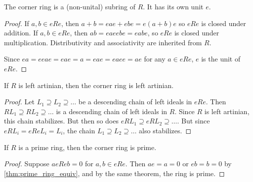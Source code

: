 \begin{theorem}
  \label{thm:corner_ring_is_ring}
  \leanok
  The corner ring is a (non-unital) subring of $R$. It has its own unit $e$.
\end{theorem}
\begin{proof}
  \leanok
  If $a, b \in eRe$, then $a + b = e a e + e b e = e (a + b) e$ so $eRe$ is closed under addition.
  If $a, b \in eRe$, then $a b = e a e e b e  = e a b e$, so $eRe$ is closed under multiplication.
  Distributivity and associativity are inherited from $R$.

  Since $e a = eeae = eae = a = eae = eaee = ae$ for any $a \in eRe$, $e$ is the unit of $eRe$.
\end{proof}

\begin{theorem}
  \label{thm:corner_ring_artinian}
  \leanok
  If $R$ is left artinian, then the corner ring is left artinian.
\end{theorem}
\begin{proof}
  \leanok
  Let $L_1 \supseteq L_2 \supseteq \ldots$ be a descending chain of left ideals in $eRe$. Then $ RL_1 \supseteq RL_2 \supseteq \ldots$ is a descending chain of left ideals in $R$. Since $R$ is left artinian, this chain stabilizes. But then so does $eRL_1 \supseteq eRL_2 \supseteq \ldots$. But since $eRL_i = eReL_i = L_i$, the chain $L_1 \supseteq L_2 \supseteq \ldots$ also stabilizes.
\end{proof}

\begin{theorem}
  \label{thm:corner_ring_prime}
  \leanok
  If $R$ is a prime ring, then the corner ring is prime.
\end{theorem}
\begin{proof}
  \leanok
  Suppose $aeReb = 0$ for $a, b \in eRe$. Then $ae = a = 0$ or $eb = b = 0$ by \ref{thm:prime_ring_equiv}, and by the same theorem, the ring is prime.
\end{proof}

